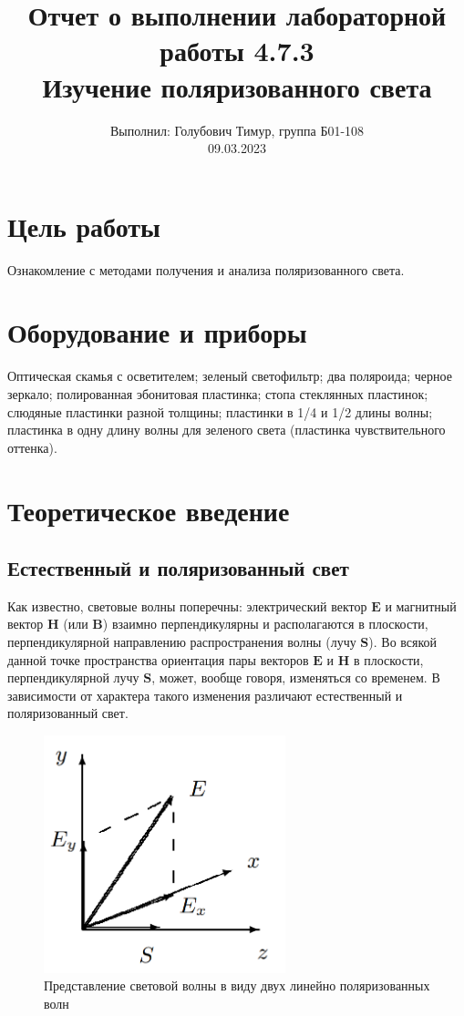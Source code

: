 \documentclass[12pt,a4paper]{article}
\author{\normalsize Выполнил: Голубович Тимур, группа Б01-108 \\
    	\normalsize 09.03.2023}
\date{}
\title{
    	\large Отчет о выполнении лабораторной работы 4.7.3 \\
    	\Large Изучение поляризованного света \\
    }
\begin{document}
    	\maketitle
    	
    \section*{Цель работы}
    Ознакомление с методами получения и анализа поляризованного света.
    
    
    \section*{Оборудование и приборы} 
    Оптическая скамья с осветителем;
    зеленый светофильтр;
    два поляроида;
    черное зеркало;
    полированная эбонитовая пластинка;
    стопа стеклянных пластинок;
    слюдяные пластинки разной толщины;
    пластинки в 1/4 и 1/2 длины волны;
    пластинка в одну длину волны для зеленого света (пластинка чувствительного оттенка).

	
	\section*{Теоретическое введение} 

	\subsection*{Естественный и поляризованный свет} Как известно, световые волны поперечны: электрический вектор $\boldsymbol{E}$ и магнитный вектор $\boldsymbol{H}$ (или $\boldsymbol{B}$) взаимно перпендикулярны и располагаются в плоскости, перпендикулярной направлению распространения волны (лучу $\boldsymbol{S}$). Во всякой данной	точке пространства ориентация пары векторов $\boldsymbol{E}$ и $\boldsymbol{H}$ в плоскости, перпендикулярной лучу $\boldsymbol{S}$, может, вообще говоря, изменяться со временем. В зависимости от характера такого изменения различают естественный и поляризованный свет.

	\begin{figure}[h!]
		\centering
		\includegraphics[width=7cm]{res/Decompose}
		\caption{Представление световой волны в виду двух линейно поляризованных волн}
        \label{fig:2waves}
	\end{figure}
	
\end{document}
